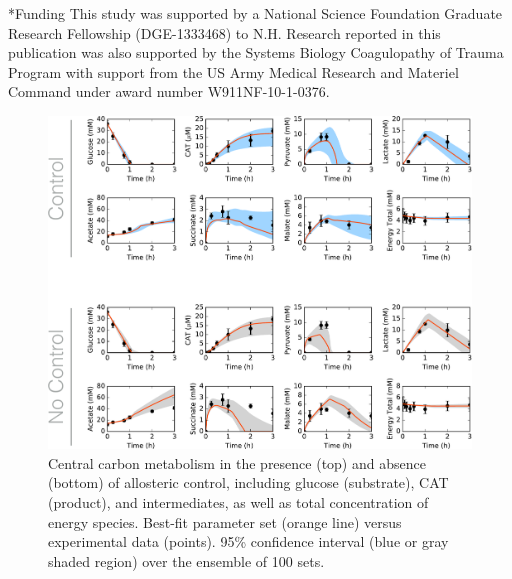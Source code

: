 \documentclass[12pt]{article}
\makeatletter
\renewcommand\section{\@startsection
	{subsection}{2}{0mm}
	{-0.2in}
	{0.05\baselineskip}
	{\normalfont\large\bfseries}}
\makeatother
\begin{document}
\section*{Funding}
This study was supported by a National Science Foundation Graduate Research Fellowship (DGE-1333468) to N.H.
Research reported in this publication was also supported by the Systems Biology Coagulopathy of Trauma Program
with support from the US Army Medical Research and Materiel Command under award number W911NF-10-1-0376.

\clearpage



\clearpage


\begin{figure}[ht]
\centering
\includegraphics[width=1.00\textwidth]{./Figures/Fig_1_Carbon.pdf}
\caption{Central carbon metabolism in the presence (top) and absence (bottom) of allosteric control, including glucose (substrate), CAT (product), and intermediates, as well as total concentration of energy species. Best-fit parameter set (orange line) versus experimental data (points). 95\% confidence interval (blue or gray shaded region) over the ensemble of 100 sets.}
\label{fig:Carbon}
\end{figure}
\end{document}
